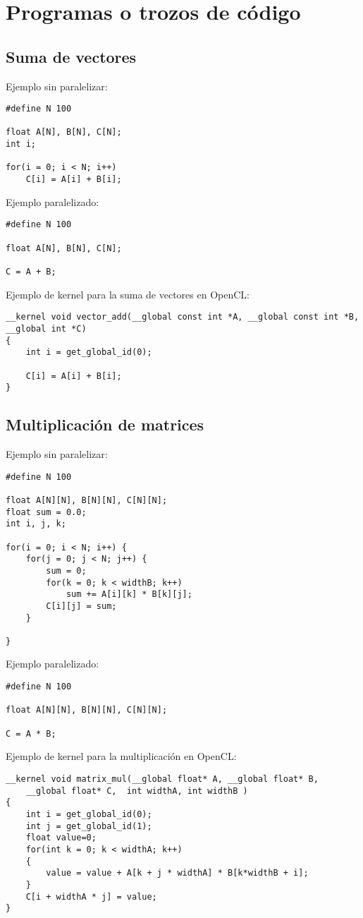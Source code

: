 \documentclass[12pt,a4paper]{article}
\begin{document}
\section{Programas o trozos de código}
\subsection{Suma de vectores}
Ejemplo sin paralelizar:
\begin{lstlisting}
#define N 100

float A[N], B[N], C[N];
int i;

for(i = 0; i < N; i++)
	C[i] = A[i] + B[i];
\end{lstlisting}

Ejemplo paralelizado:
\begin{lstlisting}
#define N 100

float A[N], B[N], C[N];

C = A + B;
\end{lstlisting}

Ejemplo de kernel para la suma de vectores en OpenCL:
\begin{lstlisting}
__kernel void vector_add(__global const int *A, __global const int *B, __global int *C)
{ 
    int i = get_global_id(0);
 
    C[i] = A[i] + B[i];
}
\end{lstlisting}
\subsection{Multiplicación de matrices}
Ejemplo sin paralelizar:
\begin{lstlisting}
#define N 100

float A[N][N], B[N][N], C[N][N];
float sum = 0.0;
int i, j, k;

for(i = 0; i < N; i++) {
	for(j = 0; j < N; j++) {
		sum = 0;
		for(k = 0; k < widthB; k++)
			sum += A[i][k] * B[k][j];
		C[i][j] = sum;
	}

}
\end{lstlisting}

Ejemplo paralelizado:
\begin{lstlisting}
#define N 100

float A[N][N], B[N][N], C[N][N];

C = A * B;
\end{lstlisting}

Ejemplo de kernel para la multiplicación en OpenCL:
\begin{lstlisting}
__kernel void matrix_mul(__global float* A, __global float* B, 
	__global float* C,  int widthA, int widthB )
{
    int i = get_global_id(0);
    int j = get_global_id(1);
    float value=0;
    for(int k = 0; k < widthA; k++)
    {
        value = value + A[k + j * widthA] * B[k*widthB + i];
    }
    C[i + widthA * j] = value;
}
\end{lstlisting}
\end{document}
